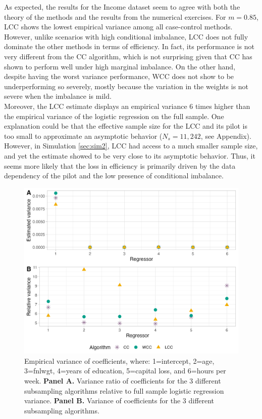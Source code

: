 As expected, the results for the Income dataset seem to agree with both the theory of the methods and the results from the numerical exercises. For $m=0.85$, LCC shows the lowest empirical variance among all case-control methods. However, unlike scenarios with high conditional imbalance, LCC does not fully dominate the other methods in terms of efficiency. In fact, its performance is not very different from the CC algorithm, which is not surprising given that CC has shown to perform well under high marginal imbalance. On the other hand, despite having the worst variance performance, WCC does not show to be underperforming so severely, mostly because the variation in the weights is not severe when the imbalance is mild. \\

Moreover, the LCC estimate displays an empirical variance $6$ times higher than the empirical variance of the logistic regression on the full sample. One explanation could be that the effective sample size for the LCC and its pilot is too small to approximate an asymptotic behavior ($N_s = 11,242$, see Appendix). However, in Simulation \ref{sec:sim2}, LCC had access to a much smaller sample size, and yet the estimate showed to be very close to its asymptotic behavior. Thus, it seems more likely that the loss in efficiency is primarily driven by the data dependency of the pilot and the low presence of conditional imbalance. \\

\begin{figure}[ht]
    \centering
    \includegraphics[scale=0.7]{2_Figures/all_variances.png}
    \caption[Data application - Relative variance of coefficients]{Empirical variance of coefficients, where: 1=intercept, 2=age, 3=fnlwgt, 4=years of education, 5=capital loss, and 6=hours per week. \textbf{Panel A.} Variance ratio of coefficients for the 3 different subsampling algorithms relative to full sample logistic regression variance. \textbf{Panel B.} Variance of coefficients for the 3 different subsampling algorithms.}
    \label{fig:all-vars-data}
\end{figure}

